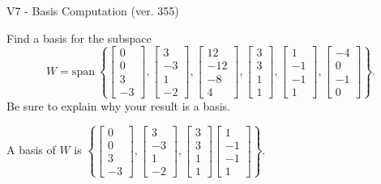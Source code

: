 \begin{exercise}
  \begin{exerciseTitle}V7 - Basis Computation (ver. 355)\end{exerciseTitle}
  \begin{exerciseStatement}
    Find a basis for the subspace 
\[W=\mathrm{span}\ \left\{\left[\begin{array}{r}
0 \\
0 \\
3 \\
-3
\end{array}\right] , \left[\begin{array}{r}
3 \\
-3 \\
1 \\
-2
\end{array}\right] , \left[\begin{array}{r}
12 \\
-12 \\
-8 \\
4
\end{array}\right] , \left[\begin{array}{r}
3 \\
3 \\
1 \\
1
\end{array}\right] , \left[\begin{array}{r}
1 \\
-1 \\
-1 \\
1
\end{array}\right] , \left[\begin{array}{r}
-4 \\
0 \\
-1 \\
0
\end{array}\right]\right\}.\]
 Be sure to explain why your result is a basis.


  \end{exerciseStatement}
  \begin{exerciseAnswer}
   A basis of \(W\) is  \(\left\{\left[\begin{array}{r}
0 \\
0 \\
3 \\
-3
\end{array}\right] , \left[\begin{array}{r}
3 \\
-3 \\
1 \\
-2
\end{array}\right] , \left[\begin{array}{r}
3 \\
3 \\
1 \\
1
\end{array}\right] \left[\begin{array}{r}
1 \\
-1 \\
-1 \\
1
\end{array}\right]\right\}\).
  


  \end{exerciseAnswer}
\end{exercise}